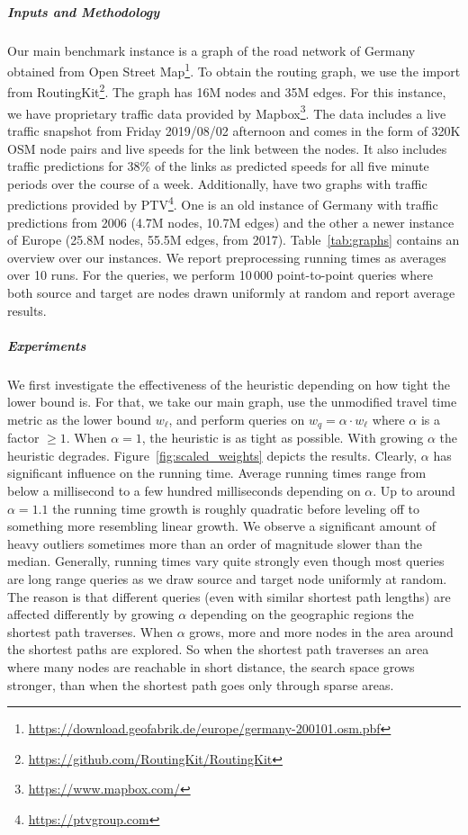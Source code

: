 \documentclass[letterpaper]{article} %
\begin{document}
\subparagraph{Inputs and Methodology}
Our main benchmark instance is a graph of the road network of Germany obtained from Open Street Map\footnote{\url{https://download.geofabrik.de/europe/germany-200101.osm.pbf}}.
To obtain the routing graph, we use the import from RoutingKit\footnote{\url{https://github.com/RoutingKit/RoutingKit}}.
The graph has 16M nodes and 35M edges.
For this instance, we have proprietary traffic data provided by Mapbox\footnote{\url{https://www.mapbox.com/}}.
The  data includes a live traffic snapshot from Friday 2019/08/02 afternoon and comes in the form of 320K OSM node pairs and live speeds for the link between the nodes.
It also includes traffic predictions for 38\% of the links as predicted speeds for all five minute periods over the course of a week.
Additionally, have two graphs with traffic predictions provided by PTV\footnote{\url{https://ptvgroup.com}}.
One is an old instance of Germany with traffic predictions from 2006 (4.7M nodes, 10.7M edges) and the other a newer instance of Europe (25.8M nodes, 55.5M edges, from 2017).
Table~\ref{tab:graphs} contains an overview over our instances.
We report preprocessing running times as averages over 10 runs.
For the queries, we perform 10\,000 point-to-point queries where both source and target are nodes drawn uniformly at random and report average results.

\subparagraph{Experiments}
We first investigate the effectiveness of the heuristic depending on how tight the lower bound is.
For that, we take our main graph, use the unmodified travel time metric as the lower bound $w_\ell$, and perform queries on $w_q = \alpha \cdot w_\ell$ where $\alpha$ is a factor $\geq 1$.
When $\alpha = 1$, the heuristic is as tight as possible.
With growing $\alpha$ the heuristic degrades.
Figure~\ref{fig:scaled_weights} depicts the results.
Clearly, $\alpha$ has significant influence on the running time.
Average running times range from below a millisecond to a few hundred milliseconds depending on $\alpha$.
Up to around $\alpha = 1.1$ the running time growth is roughly quadratic before leveling off to something more resembling linear growth.
We observe a significant amount of heavy outliers sometimes more than an order of magnitude slower than the median.
Generally, running times vary quite strongly even though most queries are long range queries as we draw source and target node uniformly at random.
The reason is that different queries (even with similar shortest path lengths) are affected differently by growing $\alpha$ depending on the geographic regions the shortest path traverses.
When $\alpha$ grows, more and more nodes in the area around the shortest paths are explored.
So when the shortest path traverses an area where many nodes are reachable in short distance, the search space grows stronger, than when the shortest path goes only through sparse areas.
\end{document}
